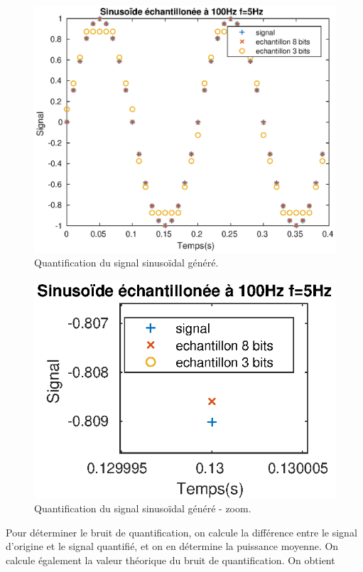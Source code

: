 \documentclass[french]{article}
\begin{document}
\begin{figure}[h!]
\centering
\includegraphics{images/signalBruit.eps}
\caption{Quantification du signal sinusoïdal généré.}
\label{signalBruit}
\end{figure}
\begin{figure}[h!]
	\centering
	\includegraphics{images/signalBruit1.eps}
	\caption{Quantification du signal sinusoïdal généré - zoom.}
	\label{signalBruit2}
\end{figure}


Pour déterminer le bruit de quantification, on calcule la différence entre le signal d'origine et le signal quantifié, et on en détermine la puissance moyenne. On calcule également la valeur théorique du bruit de quantification. On obtient
\end{document}

